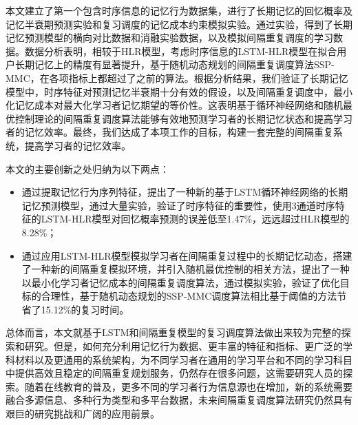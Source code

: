 \begin{conclusions}
本文建立了第一个包含时序信息的记忆行为数据集，进行了长期记忆的回忆概率及记忆半衰期预测实验和复习调度的记忆成本约束模拟实验。通过实验，得到了长期记忆预测模型的横向对比数据和消融实验数据，以及模拟间隔重复调度的学习数据。数据分析表明，相较于HLR模型，考虑时序信息的LSTM-HLR模型在拟合用户长期记忆上的精度有显著提升，基于随机动态规划的间隔重复调度算法SSP-MMC，在各项指标上都超过了之前的算法。根据分析结果，我们验证了长期记忆模型中，时序特征对预测记忆半衰期十分有效的假设，以及间隔重复调度中，最小化记忆成本对最大化学习者记忆期望的等价性。这表明基于循环神经网络和随机最优控制理论的间隔重复调度算法能够有效地预测学习者的长期记忆状态和提高学习者的记忆效率。最终，我们达成了本项工作的目标，构建一套完整的间隔重复系统，提高学习者的记忆效率。

本文的主要创新之处归纳为以下两点：
\begin{itemize}
    \item 通过提取记忆行为序列特征，提出了一种新的基于LSTM循环神经网络的长期记忆预测模型，通过大量实验，验证了时序特征的重要性，使用3通道时序特征的LSTM-HLR模型对回忆概率预测的误差低至1.47\%，远远超过HLR模型的8.28\%；
    \item 通过应用LSTM-HLR模型模拟学习者在间隔重复过程中的长期记忆动态，搭建了一种新的间隔重复模拟环境，并引入随机最优控制的相关方法，提出了一种以最小化学习者记忆成本的间隔重复调度算法，通过模拟实验，验证了优化目标的合理性，基于随机动态规划的SSP-MMC调度算法相比基于阈值的方法节省了15.12\%的复习时间。
\end{itemize}

总体而言，本文就基于LSTM和间隔重复模型的复习调度算法做出来较为完整的探索和研究。但是，如何充分利用记忆行为数据、更丰富的特征和指标、更广泛的学科材料以及更通用的系统架构，为不同学习者在通用的学习平台和不同的学习科目中提供高效且稳定的间隔重复规划服务，仍然存在很多问题，这需要研究人员的探索。随着在线教育的普及，更多不同的学习者行为信息源也在增加，新的系统需要融合多源信息、多种行为类型和多平台数据，未来间隔重复调度算法研究仍然具有艰巨的研究挑战和广阔的应用前景。
\end{conclusions}
